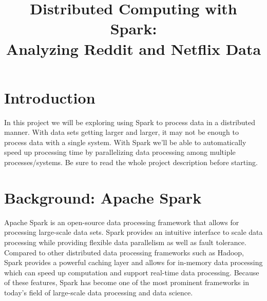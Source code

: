 \documentclass{article}
\title{Distributed Computing with Spark:\\ Analyzing Reddit and Netflix Data} %
\date{}%
\begin{document}
\maketitle %


\vspace{-1.5cm}

\section*{Introduction} %
In this project we will be exploring using Spark to process data in a distributed manner.  With data sets getting larger and larger, it may not be enough to process data with a single system. With Spark we'll be able to automatically speed up processing time by parallelizing data processing among multiple processes/systems. Be sure to read the whole project description before starting. 

\section*{Background: Apache Spark} %

Apache Spark is an open-source data processing framework that allows for processing large-scale data sets. Spark provides an intuitive interface to scale data processing while providing flexible data parallelism as well as fault tolerance. Compared to other distributed data processing frameworks such as Hadoop, Spark provides a powerful caching layer and allows for in-memory data processing which can speed up computation and support real-time data processing. Because of these features, Spark has become one of the most prominent frameworks in today's field of large-scale data processing and data science. 
\end{document}
